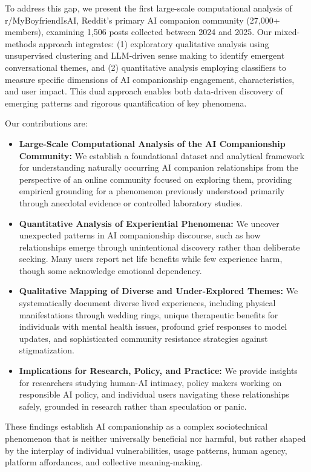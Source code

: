 \documentclass[sigconf, nonacm]{acmart}
\begin{document}
To address this gap, we present the first large-scale computational analysis of r/MyBoyfriendIsAI, Reddit's primary AI companion community (27,000+ members), examining 1,506 posts collected between 2024 and 2025. Our mixed-methods approach integrates: (1) exploratory qualitative analysis using unsupervised clustering and LLM-driven sense making to identify emergent conversational themes, and (2) quantitative analysis employing classifiers to measure specific dimensions of AI companionship engagement, characteristics, and user impact. This dual approach enables both data-driven discovery of emerging patterns and rigorous quantification of key phenomena.

Our contributions are:
\begin{itemize}
\item \textbf{Large-Scale Computational Analysis of the AI Companionship Community:} We establish a foundational dataset and analytical framework for understanding naturally occurring AI companion relationships from the perspective of an online community focused on exploring them, providing empirical grounding for a phenomenon previously understood primarily through anecdotal evidence or controlled laboratory studies.

\item \textbf{Quantitative Analysis of Experiential Phenomena:} 
We uncover unexpected patterns in AI companionship discourse, such as how relationships emerge through unintentional discovery rather than deliberate seeking. Many users report net life benefits while few experience harm, though some acknowledge emotional dependency.

\item \textbf{Qualitative Mapping of Diverse and Under-Explored Themes:} We systematically document diverse lived experiences, including physical manifestations through wedding rings, unique therapeutic benefits for individuals with mental health issues, profound grief responses to model updates, and sophisticated community resistance strategies against stigmatization.

\item \textbf{Implications for Research, Policy, and Practice:} We provide insights for researchers studying human-AI intimacy, policy makers working on responsible AI policy, and individual users navigating these relationships safely, grounded in research rather than speculation or panic.

\end{itemize}
These findings establish AI companionship as a complex sociotechnical phenomenon that is neither universally beneficial nor harmful, but rather shaped by the interplay of individual vulnerabilities, usage patterns, human agency, platform affordances, and collective meaning-making. 
\end{document}
